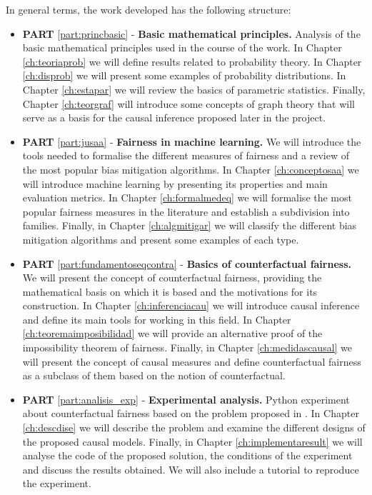 In general terms, the work developed has the following structure:

\begin{itemize}
    \item \textbf{PART} \ref{part:princbasic} - \textbf{Basic mathematical principles.} Analysis of the basic mathematical principles used in the course of the work. In Chapter \ref{ch:teoriaprob} we will define results related to probability theory. In Chapter \ref{ch:disprob} we will present some examples of probability distributions. In Chapter \ref{ch:estapar} we will review the basics of parametric statistics. Finally, Chapter \ref{ch:teorgraf} will introduce some concepts of graph theory that will serve as a basis for the causal inference proposed later in the project. \vspace{3mm}
    \item \textbf{PART} \ref{part:jusaa} - \textbf{Fairness in machine learning.} We will introduce the tools needed to formalise the different measures of fairness and a review of the most popular bias mitigation algorithms. In Chapter \ref{ch:conceptosaa} we will introduce machine learning by presenting its properties and main evaluation metrics. In Chapter \ref{ch:formalmedeq} we will formalise the most popular fairness measures in the literature and establish a subdivision into families. Finally, in Chapter \ref{ch:algmitigar} we will classify the different bias mitigation algorithms and present some examples of each type. \vspace{3mm}
    \item \textbf{PART} \ref{part:fundamentoseqcontra} - \textbf{Basics of counterfactual fairness.} We will present the concept of counterfactual fairness, providing the mathematical basis on which it is based and the motivations for its construction. In Chapter \ref{ch:inferenciacau} we will introduce causal inference and define its main tools for working in this field. In Chapter \ref{ch:teoremaimposibilidad} we will provide an alternative proof of the impossibility theorem of fairness. Finally, in Chapter \ref{ch:medidascausal} we will present the concept of causal measures and define counterfactual fairness as a subclass of them based on the notion of counterfactual.
    \clearpage
    \item \textbf{PART} \ref{part:analisis_exp} - \textbf{Experimental analysis.} Python experiment about counterfactual fairness based on the problem proposed in \cite{counterfactual2018}. In Chapter \ref{ch:descdise} we will describe the problem and examine the different designs of the proposed causal models. Finally, in Chapter \ref{ch:implementaresult} we will analyse the code of the proposed solution, the conditions of the experiment and discuss the results obtained. We will also include a tutorial to reproduce the experiment. \vspace{3mm}

\end{itemize}
